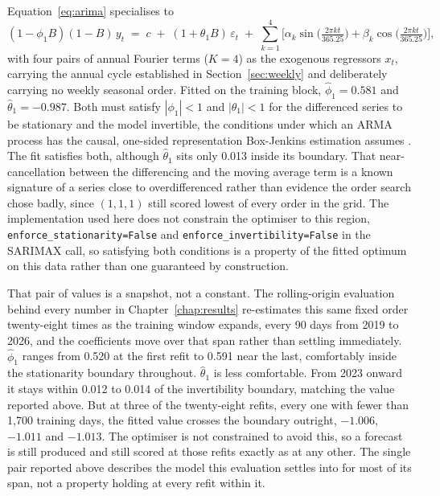 \documentclass[12pt,a4paper]{report}
\begin{document}
Equation~\ref{eq:arima} specialises to
\begin{equation}
(1 - \phi_1 B)(1-B)\,y_t \;=\; c \;+\; (1+\theta_1 B)\,\varepsilon_t \;+\;
\sum_{k=1}^{4}\Big[\alpha_k \sin\!\Big(\tfrac{2\pi k t}{365.25}\Big) +
\beta_k \cos\!\Big(\tfrac{2\pi k t}{365.25}\Big)\Big],
\label{eq:arima-fourier}
\end{equation}
with four pairs of annual Fourier terms ($K=4$) as the exogenous regressors
$x_t$, carrying the annual cycle established in Section~\ref{sec:weekly} and
deliberately carrying no weekly seasonal order. Fitted on the training
block, $\hat\phi_1 = 0.581$ and $\hat\theta_1 = -0.987$. Both must satisfy
$|\phi_1| < 1$ and $|\theta_1| < 1$ for the differenced series to be
stationary and the model invertible, the conditions under which an ARMA
process has the causal, one-sided representation Box-Jenkins estimation
assumes \citep{box2008time}. The fit satisfies both, although $\hat\theta_1$
sits only 0.013 inside its boundary. That near-cancellation between the
differencing and the moving average term is a known signature of a
series close to overdifferenced rather than evidence the order search chose
badly, since $(1,1,1)$ still scored lowest of every order in the grid. The
implementation used here does not constrain the optimiser to this region,
\texttt{enforce\_stationarity=False} and \texttt{enforce\_invertibility=False}
in the SARIMAX call, so satisfying both conditions is a property of the
fitted optimum on this data rather than one guaranteed by construction.

That pair of values is a snapshot, not a constant. The
rolling-origin evaluation behind every number in
Chapter~\ref{chap:results} re-estimates this same fixed order twenty-eight
times as the training window expands, every 90 days from 2019 to 2026,
and the coefficients move over that span rather than settling
immediately. $\hat\phi_1$ ranges from 0.520 at the first refit to 0.591
near the last, comfortably inside the stationarity boundary throughout.
$\hat\theta_1$ is less comfortable. From 2023 onward it stays within
0.012 to 0.014 of the invertibility boundary, matching the value reported
above. But at three of the twenty-eight refits, every one with fewer than
1{,}700 training days, the fitted value crosses the boundary outright,
$-1.006$, $-1.011$ and $-1.013$. The optimiser is not constrained to avoid
this, so a forecast is still produced and still scored at those refits
exactly as at any other. The single pair reported above describes the
model this evaluation settles into for most of its span, not a property
holding at every refit within it.
\end{document}
